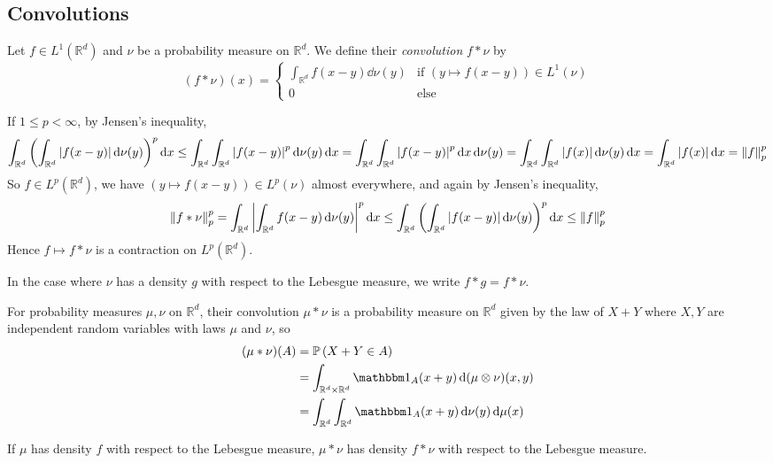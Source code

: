 \subsection{Convolutions}
\begin{definition}
	Let \( f \in L^1(\mathbb R^d) \) and \( \nu \) be a probability measure on \( \mathbb R^d \).
	We define their \emph{convolution} \( f \ast \nu \) by
	\[ (f \ast \nu)(x) = \begin{cases}
		\int_{\mathbb R^d} f(x-y) \dd{\nu(y)} & \text{if } (y \mapsto f(x-y)) \in L^1(\nu) \\
		0 & \text{else}
	\end{cases} \]
\end{definition}
\begin{remark}
	If \( 1 \leq p < \infty \), by Jensen's inequality,
	\[ \int_{\mathbb R^d} \qty( \int_{\mathbb R^d} \abs{f(x-y)} \dd{\nu(y)} )^p \dd{x} \leq \int_{\mathbb R^d} \int_{\mathbb R^d} \abs{f(x-y)}^p \dd{\nu(y)} \dd{x} = \int_{\mathbb R^d} \int_{\mathbb R^d} \abs{f(x-y)}^p \dd{x} \dd{\nu(y)} = \int_{\mathbb R^d} \int_{\mathbb R^d} \abs{f(x)} \dd{\nu(y)} \dd{x} = \int_{\mathbb R^d} \abs{f(x)} \dd{x} = \norm{f}_p^p \]
	So \( f \in L^p(\mathbb R^d) \), we have \( (y \mapsto f(x-y)) \in L^p(\nu) \) almost everywhere, and again by Jensen's inequality,
	\[ \norm{f \ast \nu}_p^p = \int_{\mathbb R^d} \abs{ \int_{\mathbb R^d} f(x-y)\dd{\nu(y)} }^p \dd{x} \leq \int_{\mathbb R^d} \qty( \int_{\mathbb R^d} \abs{f(x-y)} \dd{\nu(y)} )^p \dd{x} \leq \norm{f}_p^p \]
	Hence \( f \mapsto f \ast \nu \) is a contraction on \( L^p(\mathbb R^d) \).
\end{remark}
In the case where \( \nu \) has a density \( g \) with respect to the Lebesgue measure, we write \( f \ast g = f \ast \nu \).
\begin{definition}
	For probability measures \( \mu, \nu \) on \( \mathbb R^d \), their convolution \( \mu \ast \nu \) is a probability measure on \( \mathbb R^d \) given by the law of \( X + Y \) where \( X, Y \) are independent random variables with laws \( \mu \) and \( \nu \), so
	\begin{align*}
		(\mu \ast \nu)(A) &= \prob{X+Y \in A} \\
		&= \int_{\mathbb R^d \times \mathbb R^d} \mathbbm 1_A(x+y) \dd{(\mu \otimes \nu)(x, y)} \\
		&= \int_{\mathbb R^d} \int_{\mathbb R^d} \mathbbm 1_A(x+y) \dd{\nu(y)} \dd{\mu(x)}
	\end{align*}
\end{definition}
If \( \mu \) has density \( f \) with respect to the Lebesgue measure, \( \mu \ast \nu \) has density \( f \ast \nu \) with respect to the Lebesgue measure.
